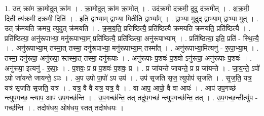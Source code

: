 \documentclass[17pt]{extarticle}
\begin{document}
1. उत् क्रा॑म क्रा॒मोदुत् क्रा॑म । . क्रा॒मोदुत् क्रा॑म क्रा॒मोत् । . उद॑क्रमी दक्रमी॒ दुदु द॑क्रमीत् । . अ॒क्र॒मी॒ दिती त्य॑क्रमी दक्रमी॒ दिति॑ । . इति॒ द्वाभ्या॒म् द्वाभ्या॒ मितीति॒ द्वाभ्या᳚म् । . द्वाभ्या॒ मुदुद् द्वाभ्या॒म् द्वाभ्या॒ मुत् । . उत् क्र॑मयति क्रमय॒ त्युदुत् क्र॑मयति । . क्र॒म॒य॒ति॒ प्रति॑ष्ठित्यै॒ प्रति॑ष्ठित्यै क्रमयति क्रमयति॒ प्रति॑ष्ठित्यै । . प्रति॑ष्ठित्या॒ अनु॑रूपाभ्या॒ मनु॑रूपाभ्या॒म् प्रति॑ष्ठित्यै॒ प्रति॑ष्ठित्या॒ अनु॑रूपाभ्याम् । . प्रति॑ष्ठित्या॒ इति॒ प्रति॑ - स्थि॒त्यै॒ । . अनु॑रूपाभ्या॒म् तस्मा॒त् तस्मा॒ दनु॑रूपाभ्या॒ मनु॑रूपाभ्या॒म् तस्मा᳚त् । . अनु॑रूपाभ्या॒मित्यनु॑ - रू॒पा॒भ्या॒म् । . तस्मा॒ दनु॑रूपा॒ अनु॑रूपा॒ स्तस्मा॒त् तस्मा॒ दनु॑रूपाः । . अनु॑रूपाः प॒शवः॑ प॒शवो ऽनु॑रूपा॒ अनु॑रूपाः प॒शवः॑ । . अनु॑रूपा॒ इत्यनु॑ - रू॒पाः॒ । . प॒शवः॒ प्र प्र प॒शवः॑ प॒शवः॒ प्र । . प्र जा॑यन्ते जायन्ते॒ प्र प्र जा॑यन्ते । . जा॒य॒न्ते॒ ऽपो॑ ऽपो जा॑यन्ते जायन्ते॒ ऽपः । . अ॒प उपो पा॒पो॑ ऽप उप॑ । . उप॑ सृजति सृज॒ त्युपोप॑ सृजति । . सृ॒ज॒ति॒ यत्र॒ यत्र॑ सृजति सृजति॒ यत्र॑ । . यत्र॒ वै वै यत्र॒ यत्र॒ वै । . वा आप॒ आपो॒ वै वा आपः॑ । . आप॑ उप॒गच्छ॑ न्त्युप॒गच्छ॒ न्त्याप॒ आप॑ उप॒गच्छ॑न्ति । . उ॒प॒गच्छ॑न्ति॒ तत् तदु॑प॒गच्छ॑ न्त्युप॒गच्छ॑न्ति॒ तत् । . उ॒प॒गच्छ॒न्तीत्यु॑प - गच्छ॑न्ति । . तदोष॑धय॒ ओष॑धय॒ स्तत् तदोष॑धयः । \newline
\end{document}
